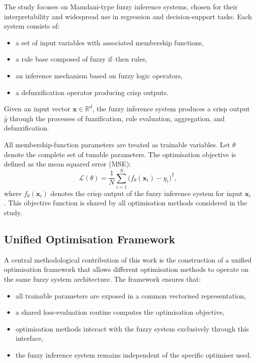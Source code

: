 \documentclass[a4paper,12pt,oneside]{article}
\begin{document}
The study focuses on Mamdani-type fuzzy inference systems, chosen for their interpretability and widespread use in regression and decision-support tasks. Each system consists of:
\begin{itemize}
    \item a set of input variables with associated membership functions,
    \item a rule base composed of fuzzy if--then rules,
    \item an inference mechanism based on fuzzy logic operators,
    \item a defuzzification operator producing crisp outputs.
\end{itemize}

Given an input vector $\mathbf{x} \in \mathbb{R}^d$, the fuzzy inference system produces a crisp output $\hat{y}$ through the processes of fuzzification, rule evaluation, aggregation, and defuzzification.

All membership-function parameters are treated as trainable variables. Let $\theta$ denote the complete set of tunable parameters. The optimisation objective is defined as the mean squared error (MSE):
\[
    \mathcal{L}(\theta)
    = \frac{1}{N} \sum_{i=1}^{N}
      \bigl( f_{\theta}(\mathbf{x}_i) - y_i \bigr)^2 ,
\]
where $f_{\theta}(\mathbf{x}_i)$ denotes the crisp output of the fuzzy inference system for input $\mathbf{x}_i$. This objective function is shared by all optimisation methods considered in the study.

\subsection{Unified Optimisation Framework}

A central methodological contribution of this work is the construction of a unified optimisation framework that allows different optimisation methods to operate on the same fuzzy system architecture. The framework ensures that:
\begin{itemize}
    \item all trainable parameters are exposed in a common vectorised representation,
    \item a shared loss-evaluation routine computes the optimisation objective,
    \item optimisation methods interact with the fuzzy system exclusively through this interface,
    \item the fuzzy inference system remains independent of the specific optimiser used.
\end{itemize}
\end{document}
